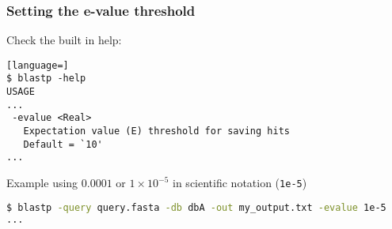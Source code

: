 %

\begin{frame}[fragile]
  \frametitle{Setting the e-value threshold}
  Check the built in help:
\begin{lstlisting}[language=]
$ blastp -help
USAGE
...
 -evalue <Real>
   Expectation value (E) threshold for saving hits
   Default = `10'
...
\end{lstlisting}
  Example using $0.0001$ or $1 \times 10^{-5}$ in scientific notation (\texttt{1e-5})
\begin{lstlisting}[language=sh]
$ blastp -query query.fasta -db dbA -out my_output.txt -evalue 1e-5
...
\end{lstlisting}
\end{frame}
